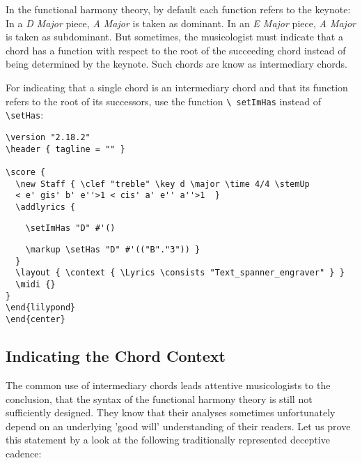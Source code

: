 \documentclass[
  DIV=calc,
  BCOR=5mm,
  12pt,
  headings=small,
  oneside,
  abstract=true,
  toc=bib,
  xcolor=dvipsnames,
  openany,
  ngerman,english]{scrartcl}
\newcommand{\acc}[0]{\textit}
\begin{document}
In the functional harmony theory, by default each function refers to the
keynote: In a \acc{D Major} piece, \acc{A Major} is taken as dominant. In an
\acc{E Major} piece, \acc{A Major} is taken as subdominant. But sometimes, the
musicologist must indicate that a chord has a function with respect to the root
of the succeeding chord instead of being determined by the keynote. Such chords
are know as intermediary chords.

For indicating that a single chord is an intermediary chord and that its function
refers to the root of its successors, use the function \texttt{\textbackslash
setImHas} instead of \texttt{\textbackslash setHas}:

\begin{center}
\end{center}

\begin{scriptsize}
\begin{verbatim}
\version "2.18.2"
\header { tagline = "" }

\score {
  \new Staff { \clef "treble" \key d \major \time 4/4 \stemUp 
  < e' gis' b' e''>1 < cis' a' e'' a''>1  }
  \addlyrics { 
\end{verbatim}
{ \color{red} \verb|    \setImHas "D" #'() | }
\begin{verbatim}  
    \markup \setHas "D" #'(("B"."3")) }  
  }
  \layout { \context { \Lyrics \consists "Text_spanner_engraver" } }
  \midi {}
}
\end{lilypond}
\end{center}
\end{verbatim}
\end{scriptsize} 
 
\subsection{Indicating the Chord Context}

The common use of intermediary chords leads attentive musicologists to the
conclusion, that the syntax of the functional harmony theory is still not
sufficiently designed. They know that their analyses sometimes unfortunately
depend on an underlying 'good will' understanding of their readers. Let us prove
this statement by a look at the following traditionally represented deceptive
cadence:
\end{document}
